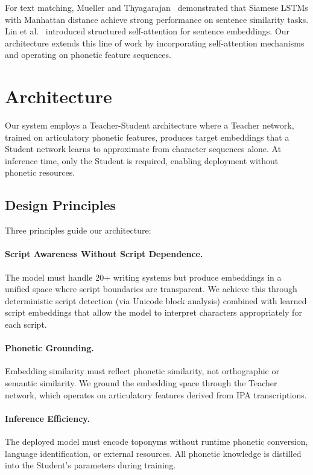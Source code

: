 \documentclass[11pt,a4paper]{article}
\begin{document}
For text matching, Mueller and Thyagarajan~\citep{mueller2016} demonstrated that Siamese LSTMs with Manhattan distance achieve strong performance on sentence similarity tasks. Lin et al.~\citep{lin2017structured} introduced structured self-attention for sentence embeddings. Our architecture extends this line of work by incorporating self-attention mechanisms and operating on phonetic feature sequences.


\section{Architecture}
\label{sec:architecture}

Our system employs a Teacher-Student architecture where a Teacher network, trained on articulatory phonetic features, produces target embeddings that a Student network learns to approximate from character sequences alone. At inference time, only the Student is required, enabling deployment without phonetic resources.

\subsection{Design Principles}

Three principles guide our architecture:

\paragraph{Script Awareness Without Script Dependence.} The model must handle 20+ writing systems but produce embeddings in a unified space where script boundaries are transparent. We achieve this through deterministic script detection (via Unicode block analysis) combined with learned script embeddings that allow the model to interpret characters appropriately for each script.

\paragraph{Phonetic Grounding.} Embedding similarity must reflect phonetic similarity, not orthographic or semantic similarity. We ground the embedding space through the Teacher network, which operates on articulatory features derived from IPA transcriptions.

\paragraph{Inference Efficiency.} The deployed model must encode toponyms without runtime phonetic conversion, language identification, or external resources. All phonetic knowledge is distilled into the Student's parameters during training.
\end{document}
